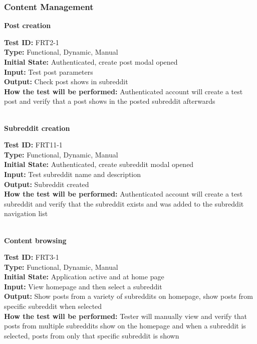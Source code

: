 \documentclass[12pt,fleqn]{article}
\begin{document}
\subsubsection{Content Management}

\textbf{Post creation}
\begin{tcolorbox}
\textbf{Test ID:} FRT2-1\\
\textbf{Type:} Functional, Dynamic, Manual\\
\textbf{Initial State:} Authenticated, create post modal opened\\
\textbf{Input:} Test post parameters\\
\textbf{Output:} Check post shows in subreddit\\
\textbf{How the test will be performed:} Authenticated account will create a test post and verify that a post shows in the posted subreddit afterwards
\end{tcolorbox}

\textbf{\\Subreddit creation}
\begin{tcolorbox}
\textbf{Test ID:} FRT11-1\\ %
\textbf{Type:} Functional, Dynamic, Manual\\
\textbf{Initial State:} Authenticated, create subreddit modal opened\\
\textbf{Input:} Test subreddit name and description\\
\textbf{Output:} Subreddit created\\
\textbf{How the test will be performed:} Authenticated account will create a test subreddit and verify that the subreddit exists and was added to the subreddit navigation list
\end{tcolorbox}

\newpage

\textbf{\\Content browsing}
\begin{tcolorbox}
\textbf{Test ID:} FRT3-1\\
\textbf{Type:} Functional, Dynamic, Manual\\
\textbf{Initial State:} Application active and at home page\\
\textbf{Input:} View homepage and then select a subreddit\\
\textbf{Output:} Show posts from a variety of subreddits on homepage, show posts from specific subreddit when selected\\
\textbf{How the test will be performed:} Tester will manually view and verify that posts from multiple subreddits show on the homepage and when a subreddit is selected, posts from only that specific subreddit is shown
\end{tcolorbox}
\end{document}
